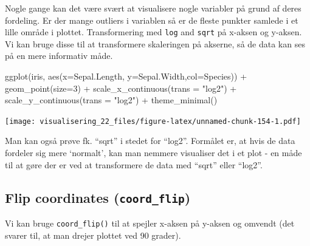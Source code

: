\documentclass[
]{book}
\newenvironment{Shaded}{\begin{snugshade}}{\end{snugshade}}
\newcommand{\AttributeTok}[1]{\textcolor[rgb]{0.77,0.63,0.00}{#1}}
\newcommand{\DecValTok}[1]{\textcolor[rgb]{0.00,0.00,0.81}{#1}}
\newcommand{\FunctionTok}[1]{\textcolor[rgb]{0.00,0.00,0.00}{#1}}
\newcommand{\NormalTok}[1]{#1}
\newcommand{\SpecialCharTok}[1]{\textcolor[rgb]{0.00,0.00,0.00}{#1}}
\newcommand{\StringTok}[1]{\textcolor[rgb]{0.31,0.60,0.02}{#1}}
\begin{document}
Nogle gange kan det være svært at visualisere nogle variabler på grund af deres fordeling. Er der mange outliers i variablen så er de fleste punkter samlede i et lille område i plottet. Transformering med \texttt{log} and \texttt{sqrt} på x-aksen og y-aksen. Vi kan bruge disse til at transformere skaleringen på akserne, så de data kan ses på en mere informativ måde.

\begin{Shaded}
\begin{Highlighting}[]
\FunctionTok{ggplot}\NormalTok{(iris, }\FunctionTok{aes}\NormalTok{(}\AttributeTok{x=}\NormalTok{Sepal.Length, }\AttributeTok{y=}\NormalTok{Sepal.Width,}\AttributeTok{col=}\NormalTok{Species)) }\SpecialCharTok{+}
  \FunctionTok{geom\_point}\NormalTok{(}\AttributeTok{size=}\DecValTok{3}\NormalTok{) }\SpecialCharTok{+} 
  \FunctionTok{scale\_x\_continuous}\NormalTok{(}\AttributeTok{trans =} \StringTok{"log2"}\NormalTok{) }\SpecialCharTok{+}
  \FunctionTok{scale\_y\_continuous}\NormalTok{(}\AttributeTok{trans =} \StringTok{"log2"}\NormalTok{) }\SpecialCharTok{+}
  \FunctionTok{theme\_minimal}\NormalTok{() }
\end{Highlighting}
\end{Shaded}

\texttt{[image: visualisering\_22\_files/figure-latex/unnamed-chunk-154-1.pdf]}

Man kan også prøve fk. ``sqrt'' i stedet for ``log2''. Formålet er, at hvis de data fordeler sig mere `normalt', kan man nemmere visualiser det i et plot - en måde til at gøre der er ved at transformere de data med ``sqrt'' eller ``log2''.

\hypertarget{flip-coordinates-coord_flip}{%
\subsection{\texorpdfstring{Flip coordinates (\texttt{coord\_flip})}{Flip coordinates (coord\_flip)}}\label{flip-coordinates-coord_flip}}

Vi kan bruge \texttt{coord\_flip()} til at spejler x-aksen på y-aksen og omvendt (det svarer til, at man drejer plottet ved 90 grader).
\end{document}
